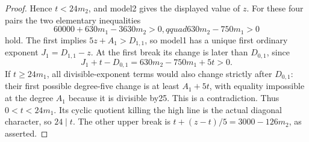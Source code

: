 \begin{proof}
Hence $t<24m_2$, and model2 gives the displayed value of $z$.
For these four pairs the two elementary inequalities
\[
 60000+630m_1-3630m_2>0,qquad 630m_2-750m_1>0          \tag{B-RD94.13}
\]
hold. The first implies
$5z+A_1>D_{1,1}$, so model1 has a unique first ordinary exponent
$J_1=D_{1,1}-z$. At the first break its change is later than
$D_{0,1}$, since
\[
             J_1+t-D_{0,1}=630m_2-750m_1+5t>0.
\]
If $t\ge24m_1$, all divisible-exponent terms would also change
strictly after $D_{0,1}$: their first possible degree-five change
is at least $A_1+5t$, with equality impossible at the degree
$A_1$ because it is divisible by25. This is a contradiction.
Thus $0<t<24m_1$. Its cyclic quotient killing the high line is the
actual diagonal character, so $24\mid t$. The other upper break
is $t+(z-t)/5=3000-126m_2$, as asserted.
\end{proof}

